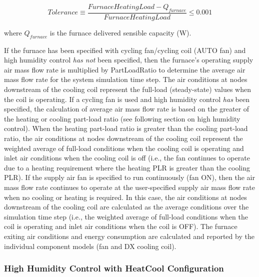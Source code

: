 \begin{equation}
  Tolerance \equiv \frac{FurnaceHeatingLoad - Q_{furnace}}{FurnaceHeatingLoad} \leq 0.001
\end{equation}

where \({Q_{furnace}}\) is the furnace delivered sensible capacity (W).

If the furnace has been specified with cycling fan/cycling coil (AUTO fan) and high humidity control \emph{has not} been specified, then the furnace's operating supply air mass flow rate is multiplied by PartLoadRatio to determine the average air mass flow rate for the system simulation time step. The air conditions at nodes downstream of the cooling coil represent the full-load (steady-state) values when the coil is operating. If a cycling fan is used and high humidity control \emph{has} been specified, the calculation of average air mass flow rate is based on the greater of the heating or cooling part-load ratio (see following section on high humidity control). When the heating part-load ratio is greater than the cooling part-load ratio, the air conditions at nodes downstream of the cooling coil represent the weighted average of full-load conditions when the cooling coil is operating and inlet air conditions when the cooling coil is off (i.e., the fan continues to operate due to a heating requirement where the heating PLR is greater than the cooling PLR). If the supply air fan is specified to run continuously (fan ON), then the air mass flow rate continues to operate at the user-specified supply air mass flow rate when no cooling or heating is required. In this case, the air conditions at nodes downstream of the cooling coil are calculated as the average conditions over the simulation time step (i.e., the weighted average of full-load conditions when the coil is operating and inlet air conditions when the coil is OFF). The furnace exiting air conditions and energy consumption are calculated and reported by the individual component models (fan and DX cooling coil).

\subsubsection{High Humidity Control with HeatCool Configuration}\label{high-humidity-control-with-heatcool-configuration}

